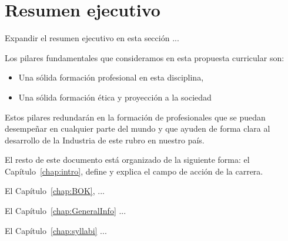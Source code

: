  \chapter*{Resumen ejecutivo}
\AbstractIntro

Expandir el resumen ejecutivo en esta sección ...

Los pilares fundamentales que consideramos en esta propuesta curricular son:
\begin{itemize}
\item Una sólida formación profesional en esta disciplina,
\item Una sólida formación ética y proyección a la sociedad
\end{itemize}

Estos pilares redundarán en la formación de profesionales que se puedan desempeñar en 
cualquier parte del mundo y que ayuden de forma clara al desarrollo de la Industria 
de este rubro en nuestro país. 

\OtherKeyStones

El resto de este documento está organizado de la siguiente forma: el Capítulo~\ref{chap:intro}, 
define y explica el campo de acción de la carrera.

El Capítulo~\ref{chap:BOK}, ...

El Capítulo~\ref{chap:GeneralInfo} ...

El Capítulo~\ref{chap:syllabi} ...

\newpage